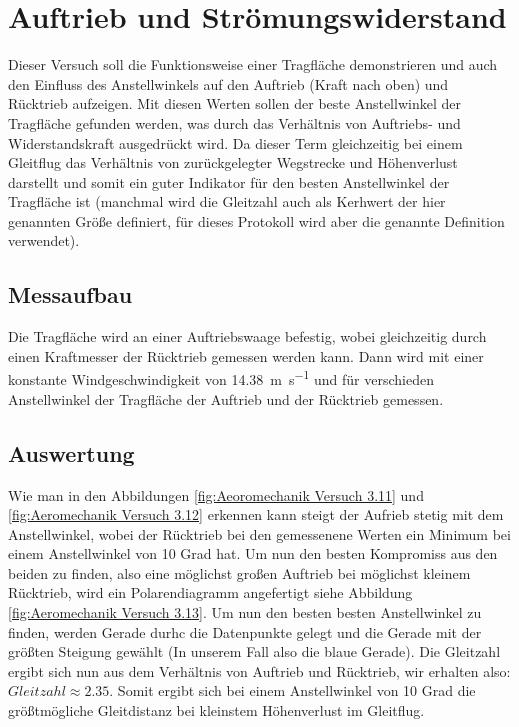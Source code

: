 \section{Auftrieb und Strömungswiderstand}

Dieser Versuch soll die Funktionsweise einer Tragfläche demonstrieren und auch den Einfluss des Anstellwinkels auf den Auftrieb (Kraft nach oben) und Rücktrieb aufzeigen. Mit diesen Werten sollen der beste Anstellwinkel der Tragfläche gefunden werden, was durch das Verhältnis von Auftriebs- und Widerstandskraft ausgedrückt wird. Da dieser Term gleichzeitig bei einem Gleitflug das Verhältnis von zurückgelegter Wegstrecke und Höhenverlust darstellt und somit ein guter Indikator für den besten Anstellwinkel der Tragfläche ist (manchmal wird die Gleitzahl auch als Kerhwert der hier genannten Größe definiert, für dieses Protokoll wird aber die genannte Definition verwendet).

\subsection{Messaufbau}

Die Tragfläche wird an einer Auftriebswaage befestig, wobei gleichzeitig durch einen Kraftmesser der Rücktrieb gemessen werden kann. Dann wird mit einer konstante Windgeschwindigkeit von \SI{14.38}{\metre\per\second} und für verschieden Anstellwinkel der Tragfläche der Auftrieb und der Rücktrieb gemessen.

\subsection{Auswertung}

Wie man in den Abbildungen \ref{fig:Aeoromechanik Versuch 3.11} und \ref{fig:Aeromechanik Versuch 3.12} erkennen kann steigt der Aufrieb stetig mit dem Anstellwinkel, wobei der Rücktrieb bei den gemessenene Werten ein Minimum bei einem Anstellwinkel von 10 Grad hat. Um nun den besten Kompromiss aus den beiden zu finden, also eine möglichst großen Auftrieb bei möglichst kleinem Rücktrieb, wird ein Polarendiagramm angefertigt siehe Abbildung \ref{fig:Aeromechanik Versuch 3.13}. Um nun den besten besten Anstellwinkel zu finden, werden Gerade durhc die Datenpunkte gelegt und die Gerade mit der größten Steigung gewählt (In unserem Fall also die blaue Gerade). Die Gleitzahl ergibt sich nun aus dem Verhältnis von Auftrieb und Rücktrieb, wir erhalten also:  $Gleitzahl \approx 2.35$. Somit ergibt sich bei einem Anstellwinkel von 10 Grad die größtmögliche Gleitdistanz bei kleinstem Höhenverlust im Gleitflug.


